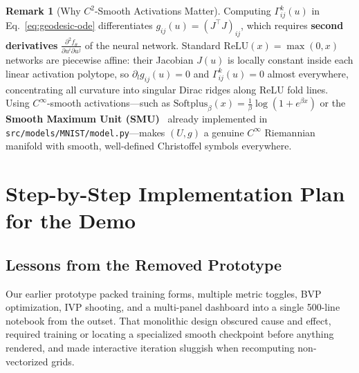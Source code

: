 \documentclass[11pt,a4paper]{article}
\theoremstyle{definition}
\newtheorem{remark}{Remark}[section]
\begin{document}
\begin{remark}[Why $C^2$-Smooth Activations Matter]
Computing $\Gamma^k_{ij}(u)$ in Eq.~\eqref{eq:geodesic-ode} differentiates $g_{ij}(u) = (J^\top J)_{ij}$, which requires \textbf{second derivatives} $\frac{\partial^2 f_\theta}{\partial u^i \partial u^j}$ of the neural network. Standard $\mathrm{ReLU}(x) = \max(0, x)$ networks are piecewise affine: their Jacobian $J(u)$ is locally constant inside each linear activation polytope, so $\partial_l g_{ij}(u) = 0$ and $\Gamma^k_{ij}(u) = 0$ almost everywhere, concentrating all curvature into singular Dirac ridges along ReLU fold lines. Using $C^\infty$-smooth activations---such as $\mathrm{Softplus}_\beta(x) = \frac{1}{\beta}\log(1 + e^{\beta x})$ or the \textbf{Smooth Maximum Unit (SMU)}~\cite{biswas2022smu} already implemented in \texttt{src/models/MNIST/model.py}---makes $(U, g)$ a genuine $C^\infty$ Riemannian manifold with smooth, well-defined Christoffel symbols everywhere.
\end{remark}

\section{Step-by-Step Implementation Plan for the Demo}
\label{sec:implementation-plan}

\subsection{Lessons from the Removed Prototype}

Our earlier prototype packed training forms, multiple metric toggles, BVP optimization, IVP shooting, and a multi-panel dashboard into a single 500-line notebook from the outset. That monolithic design obscured cause and effect, required training or locating a specialized smooth checkpoint before anything rendered, and made interactive iteration sluggish when recomputing non-vectorized grids.
\end{document}
